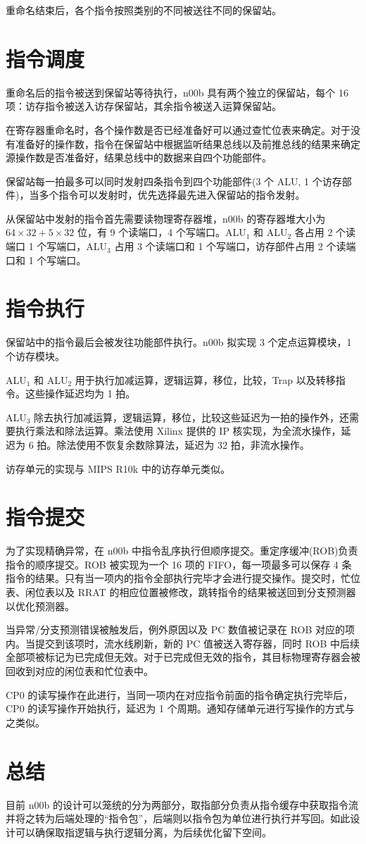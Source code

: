 \documentclass[blue,normal,cn]{elegantnote}
\begin{document}
重命名结束后，各个指令按照类别的不同被送往不同的保留站。

\section{指令调度}

重命名后的指令被送到保留站等待执行，n00b 具有两个独立的保留站，每个 16 项：访存指令被送入访存保留站，其余指令被送入运算保留站。

在寄存器重命名时，各个操作数是否已经准备好可以通过查忙位表来确定。对于没有准备好的操作数，指令在保留站中根据监听结果总线以及前推总线的结果来确定源操作数是否准备好，结果总线中的数据来自四个功能部件。

保留站每一拍最多可以同时发射四条指令到四个功能部件(3 个 ALU, 1 个访存部件)，当多个指令可以发射时，优先选择最先进入保留站的指令发射。

从保留站中发射的指令首先需要读物理寄存器堆，n00b 的寄存器堆大小为 $64 \times 32 + 5 \times 32$ 位，有 9 个读端口，4 个写端口。ALU$_1$ 和 ALU$_2$ 各占用 2 个读端口 1 个写端口，ALU$_3$ 占用 3 个读端口和 1 个写端口，访存部件占用 2 个读端口和 1 个写端口。

\section{指令执行}

保留站中的指令最后会被发往功能部件执行。n00b 拟实现 3 个定点运算模块，1 个访存模块。

ALU$_1$ 和 ALU$_2$ 用于执行加减运算，逻辑运算，移位，比较，Trap 以及转移指令。这些操作延迟均为 1 拍。

ALU$_3$ 除去执行加减运算，逻辑运算，移位，比较这些延迟为一拍的操作外，还需要执行乘法和除法运算。乘法使用 Xilinx 提供的 IP 核实现，为全流水操作，延迟为 6 拍。除法使用不恢复余数除算法，延迟为 32 拍，非流水操作。

访存单元的实现与 MIPS R10k 中的访存单元类似。

\section{指令提交}
为了实现精确异常，在 n00b 中指令乱序执行但顺序提交。重定序缓冲(ROB)负责指令的顺序提交。ROB 被实现为一个 16 项的 FIFO，每一项最多可以保存 4 条指令的结果。只有当一项内的指令全部执行完毕才会进行提交操作。提交时，忙位表、闲位表以及 RRAT 的相应位置被修改，跳转指令的结果被送回到分支预测器以优化预测器。

当异常/分支预测错误被触发后，例外原因以及 PC 数值被记录在 ROB 对应的项内。当提交到该项时，流水线刷新，新的 PC 值被送入寄存器，同时 ROB 中后续全部项被标记为已完成但无效。对于已完成但无效的指令，其目标物理寄存器会被回收到对应的闲位表和忙位表中。

CP0 的读写操作在此进行，当同一项内在对应指令前面的指令确定执行完毕后，CP0 的读写操作开始执行，延迟为 1 个周期。通知存储单元进行写操作的方式与之类似。

\section{总结}
目前 n00b 的设计可以笼统的分为两部分，取指部分负责从指令缓存中获取指令流并将之转为后端处理的``指令包''，后端则以指令包为单位进行执行并写回。如此设计可以确保取指逻辑与执行逻辑分离，为后续优化留下空间。
\end{document}
